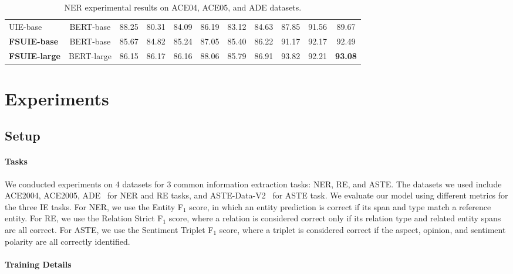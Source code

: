 \documentclass[11pt]{article}
\begin{document}
\begin{table}[t]
{\begin{tabular}{lcccccccccc}
         \midrule
         UIE-base & BERT-base & 88.25  & 80.31 & 84.09  & 86.19 & 83.12 & 84.63  & 87.85 & 91.56 & 89.67 \\
        \bf FSUIE-base  & BERT-base & 85.67 & 84.82 & 85.24 & 87.05 & 85.40 & 86.22  & 91.17 & 92.17 & 92.49 \\
        \bf FSUIE-large & BERT-large   &86.15 &86.17 &86.16 &88.06 &85.79 &86.91 &93.82 &92.21 &\textbf{93.08} \\
        \bottomrule
    \end{tabular}
    }
    \caption{NER experimental results on ACE04, ACE05, and ADE datasets.}
    \label{tab:ner_results}
\end{table}


\section{Experiments}

\subsection{Setup}

\paragraph{Tasks} 

We conducted experiments on 4 datasets for 3 common information extraction tasks: NER, RE, and ASTE. The datasets we used include ACE2004, ACE2005, ADE~\cite{DBLP:journals/jbi/GurulingappaRRFHT12} for NER and RE tasks, and ASTE-Data-V2~\cite{xu-etal-2020-position} for ASTE task. 
We evaluate our model using different metrics for the three IE tasks. For NER, we use the Entity F$_1$ score, in which an entity prediction is correct if its span and type match a reference entity. For RE, we use the Relation Strict F$_1$ score, where a relation is considered correct only if its relation type and related entity spans are all correct. For ASTE, we use the Sentiment Triplet F$_1$ score, where a triplet is considered correct if the aspect, opinion, and sentiment polarity are all correctly identified.



\paragraph{Training Details} 
\end{document}
